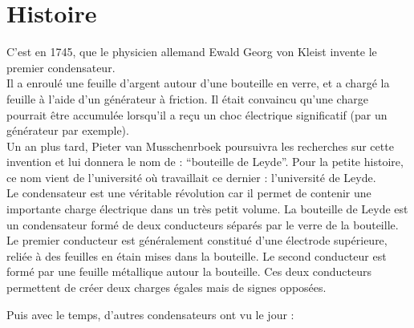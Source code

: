 

\chapter{Histoire} 

C’est en 1745, que le physicien allemand Ewald Georg von Kleist invente le premier condensateur. \\
Il a enroulé une feuille d'argent autour d'une bouteille en verre,  et  a  chargé  la  feuille  à  l'aide  d'un  générateur  à  
friction. Il était convaincu  qu'une  charge  pourrait  être  accumulée  lorsqu'il  a  reçu  un  choc  électrique  significatif 
(par un générateur par exemple). \\

Un an plus tard, Pieter van Musschenrboek poursuivra les recherches sur cette invention et lui donnera le nom de : 
“bouteille de Leyde”. Pour la petite histoire, ce nom vient de l’université où travaillait ce dernier : l’université de Leyde. \\
Le condensateur est une véritable révolution car il permet de contenir une importante charge électrique dans un très petit volume.  
La bouteille de Leyde est un condensateur formé de deux conducteurs séparés par le verre de la bouteille.\\

Le premier conducteur est généralement constitué d'une électrode supérieure, reliée à des feuilles en étain mises dans  la  bouteille. 
 Le  second  conducteur  est  formé  par  une feuille  métallique  autour la  bouteille. Ces deux conducteurs permettent de 
 créer deux charges égales mais de signes opposées. \\



Puis avec le temps, d'autres condensateurs ont vu le jour : 

